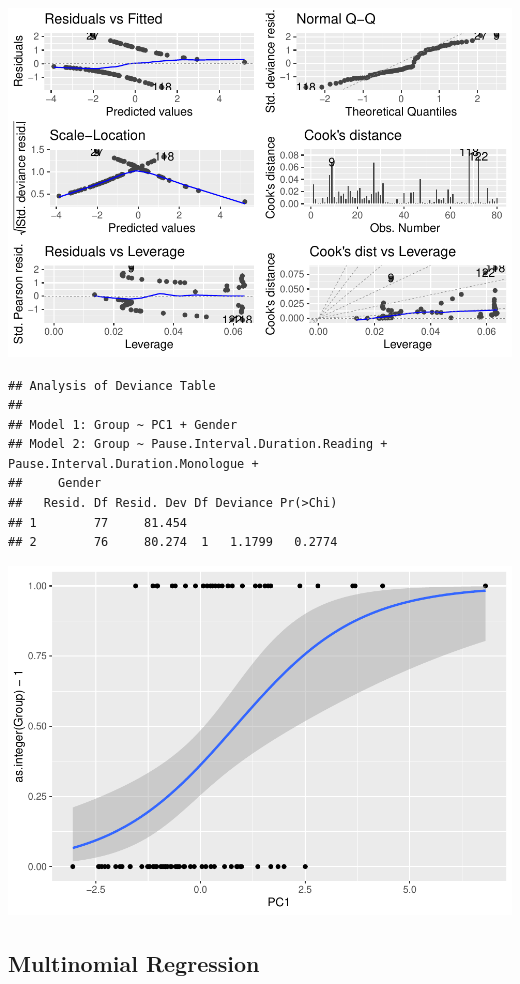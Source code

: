 \documentclass[
  english,
  doc,floatsintext]{apa6}
\begin{document}
\includegraphics{dap_report_anja_probst_files/figure-latex/compare PCA-based model to best model from eval-1.pdf}

\begin{verbatim}
## Analysis of Deviance Table
## 
## Model 1: Group ~ PC1 + Gender
## Model 2: Group ~ Pause.Interval.Duration.Reading + Pause.Interval.Duration.Monologue + 
##     Gender
##   Resid. Df Resid. Dev Df Deviance Pr(>Chi)
## 1        77     81.454                     
## 2        76     80.274  1   1.1799   0.2774
\end{verbatim}

\includegraphics{dap_report_anja_probst_files/figure-latex/compare PCA-based model to best model from eval-2.pdf}

\hypertarget{multinomial-regression}{%
\subsection{Multinomial Regression}\label{multinomial-regression}}
\end{document}
